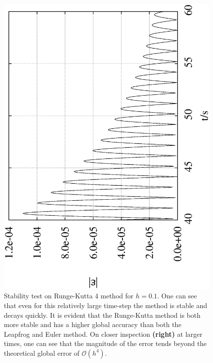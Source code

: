 \documentclass[10pt,a4paper]{article}
\begin{document}
\begin{figure}[t!]
\begin{center}
\includegraphics[scale = 0.3, angle =-90]{RungeKutta4_0.1_4000_0.2to60.eps}
\caption{Stability test on Runge-Kutta 4 method for $h=0.1$. One can see that even for this relatively large time-step the method is stable and decays quickly. It is evident that the Runge-Kutta method is both more stable and has a higher global accuracy than both the Leapfrog and Euler method. On closer inspection \textbf{(right)} at larger times, one can see that the magnitude of the error tends beyond the theoretical global error of $\mathcal{O}(h^4)$.}
\label{fig:RungeStability}
\end{center}
\end{figure}
\end{document}
